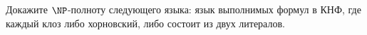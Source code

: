 Докажите $\NP$-полноту следующего языка: язык выполнимых формул в КНФ, где каждый клоз либо хорновский,
либо состоит из двух литералов. 